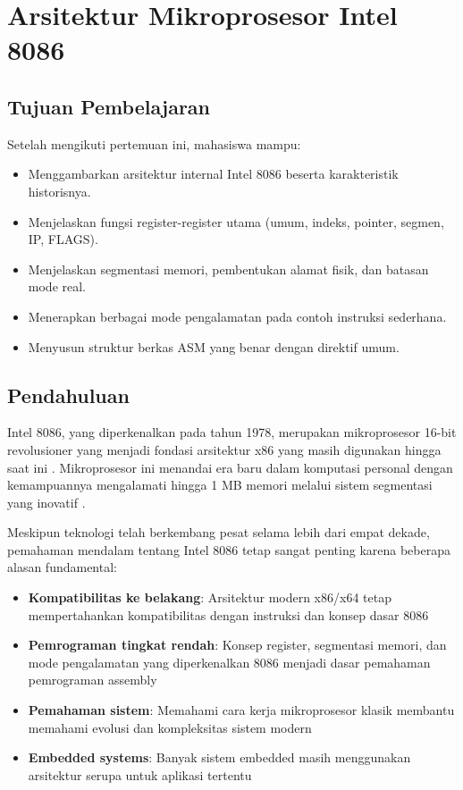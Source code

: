 \documentclass[../main.tex]{subfiles}
\begin{document}
\chapter{Arsitektur Mikroprosesor Intel 8086}

\section{Tujuan Pembelajaran}
Setelah mengikuti pertemuan ini, mahasiswa mampu:
\begin{itemize}
    \item Menggambarkan arsitektur internal Intel 8086 beserta karakteristik historisnya.
    \item Menjelaskan fungsi register-register utama (umum, indeks, pointer, segmen, IP, FLAGS).
    \item Menjelaskan segmentasi memori, pembentukan alamat fisik, dan batasan mode real.
    \item Menerapkan berbagai mode pengalamatan pada contoh instruksi sederhana.
    \item Menyusun struktur berkas ASM yang benar dengan direktif umum.
\end{itemize}

\section{Pendahuluan}
    Intel 8086, yang diperkenalkan pada tahun 1978, merupakan mikroprosesor 16-bit revolusioner yang menjadi fondasi arsitektur x86 yang masih digunakan hingga saat ini \cite{intel_8086_user_manual}. Mikroprosesor ini menandai era baru dalam komputasi personal dengan kemampuannya mengalamati hingga 1 MB memori melalui sistem segmentasi yang inovatif \cite{wiki_8086}. 

    Meskipun teknologi telah berkembang pesat selama lebih dari empat dekade, pemahaman mendalam tentang Intel 8086 tetap sangat penting karena beberapa alasan fundamental:

    \begin{itemize}
        \item \textbf{Kompatibilitas ke belakang}: Arsitektur modern x86/x64 tetap mempertahankan kompatibilitas dengan instruksi dan konsep dasar 8086
        \item \textbf{Pemrograman tingkat rendah}: Konsep register, segmentasi memori, dan mode pengalamatan yang diperkenalkan 8086 menjadi dasar pemahaman pemrograman assembly
        \item \textbf{Pemahaman sistem}: Memahami cara kerja mikroprosesor klasik membantu memahami evolusi dan kompleksitas sistem modern
        \item \textbf{Embedded systems}: Banyak sistem embedded masih menggunakan arsitektur serupa untuk aplikasi tertentu
    \end{itemize}
\end{document}
